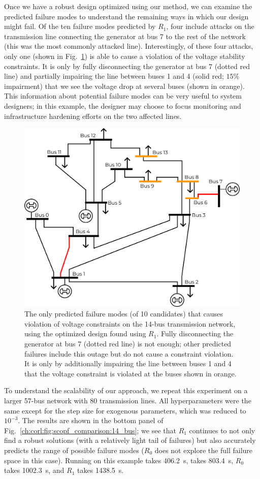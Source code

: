 Once we have a robust design optimized using our method, we can examine the predicted failure modes to understand the remaining ways in which our design might fail. Of the ten failure modes predicted by $R_1$, four include attacks on the transmission line connecting the generator at bus 7 to the rest of the network (this was the most commonly attacked line). Interestingly, of these four attacks, only one (shown in Fig.~\ref{ch:corl:fig:predicted_failure_modes}) is able to cause a violation of the voltage stability constraints. It is only by fully disconnecting the generator at bus 7 (dotted red line) and partially impairing the line between buses 1 and 4 (solid red; $15\%$ impairment) that we see the voltage drop at several buses (shown in orange). This information about potential failure modes can be very useful to system designers; in this example, the designer may choose to focus monitoring and infrastructure hardening efforts on the two affected lines.

\begin{figure}[tb]
    \centering
    \includegraphics[width=0.4\linewidth]{images/global_methods/predicted_failure_modes.png}
    \caption{The only predicted failure modes (of 10 candidates) that causes violation of voltage constraints on the 14-bus transmission network, using the optimized design found using $R_1$. Fully disconnecting the generator at bus 7 (dotted red line) is not enough; other predicted failures include this outage but do not cause a constraint violation. It is only by additionally impairing the line between buses 1 and 4 that the voltage constraint is violated at the buses shown in orange.}
    \label{ch:corl:fig:predicted_failure_modes}
\end{figure}

To understand the scalability of our approach, we repeat this experiment on a larger 57-bus network with 80 transmission lines. All hyperparameters were the same except for the step size for exogenous parameters, which was reduced to $10^{-3}$. The results are shown in the bottom panel of Fig.~\ref{ch:corl:fig:scopf_comparison:14_bus}; we see that $R_1$ continues to not only find a robust solutions (with a relatively light tail of failures) but also accurately predicts the range of possible failure modes ($R_0$ does not explore the full failure space in this case). Running \gdr{} on this example takes \SI{406.2}{s}, \gda{} takes \SI{803.4}{s}, $R_0$ takes \SI{1002.3}{s}, and $R_1$ takes \SI{1438.5}{s}.

